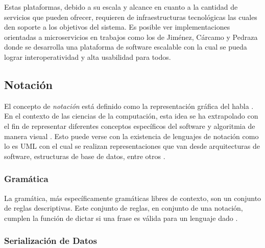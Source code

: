 \documentclass[12pt]{article}
\begin{document}
    Estas plataformas, debido a su escala y alcance en cuanto a la cantidad de servicios que pueden ofrecer, requieren de 
    infraestructuras tecnológicas las cuales den soporte a los objetivos del sistema. Es posible ver implementaciones orientadas a microservicios en trabajos como los de Jiménez, Cárcamo y Pedraza \citeyear{henry_2020} donde se desarrolla una plataforma de software escalable con la cual se pueda lograr interoperatividad y alta usabilidad para todos.


    \subsection{Notación} %



    El concepto de \textit{notación} está definido como la representación gráfica del habla \cite{crystal2011dictionary}. En el contexto de las ciencias de la computación, esta idea se ha extrapolado con el fin de representar diferentes conceptos específicos del software y algoritmia de manera visual \cite{RutanenKalle2018McoO}. Esto puede verse con la existencia de lenguajes de notación como lo es UML con el cual se realizan representaciones que van desde arquitecturas de software, estructuras de base de datos, entre otros \cite{Booch2005-xu}.
    
    \subsubsection*{Gramática}


    La gramática, más específicamente gramáticas libres de contexto, son un conjunto de reglas descriptivas. Este conjunto de reglas, en conjunto de una notación, cumplen la función de dictar si una frase es válida para un lenguaje dado \cite[p. 101]{Sipser2012-wl}. 

    

    \subsubsection*{Serialización de Datos}
\end{document}
